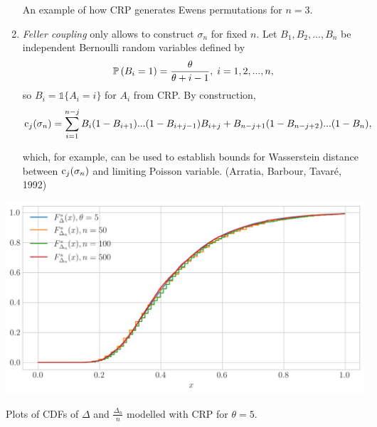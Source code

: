 \documentclass[12pt,pdf,aspectratio=169,t]{beamer}
\begin{document}
\begin{frame}[allowframebreaks]
\begin{enumerate}
\begin{center}
                An example of how CRP generates Ewens permutations for $n = 3$.
            \end{center}
            \item \emph{Feller coupling} only allows to construct $\sigma_n$ for fixed $n$. 
            Let $B_1, B_2, ..., B_n$ be independent Bernoulli random variables defined by
            \begin{gather}
                \P{B_i = 1} = \frac{\theta}{\theta + i - 1}, \; i = 1, 2, ..., n,
            \end{gather}
            so $B_i = \mathds{1}\{A_i = i\}$ for $A_i$ from CRP. By construction,
            \begin{gather*}
                \cycle_j(\sigma_n) = \sum_{i=1}^{n-j} B_i (1 - B_{i+1}) ... (1 - B_{i + j - 1}) B_{i+j}
                + B_{n - j + 1} (1 - B_{n - j + 2}) ... (1 - B_n),
            \end{gather*}
            
            which, for example, can be used to establish bounds for Wasserstein distance
            between $\cycle_j(\sigma_n)$ and limiting Poisson variable. (Arratia, Barbour, Tavaré, 1992)
        \end{enumerate}
        \begin{center}
            \includegraphics[scale=0.55]{plots/fp_spacing_max_theta_5.png}

            Plots of CDFs of $\Delta$ and $\frac{\Delta_n}{n}$ modelled with CRP for $\theta = 5$.
        \end{center}
    \end{frame}
\end{document}

